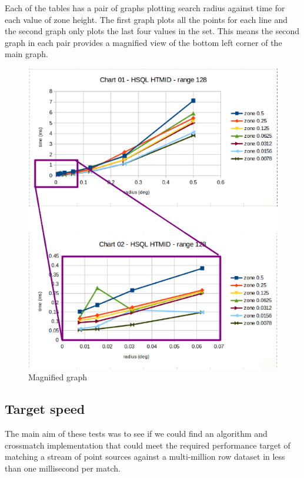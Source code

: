 \documentclass{article}
\newcommand{\crossmatch} {crossmatch\xspace}
\newcommand{\dataset} {dataset\xspace}
\begin{document}
Each of the tables has a pair of graphs plotting search radius against time for each value of zone height. The first graph plots all the points for each line and the second graph only plots the last four values in the set. This means the second graph in each pair provides a magnified view of the bottom left corner of the main graph.

\begin{figure}[hbt!]
\centering
\includegraphics[scale=0.75]{images/graph-zoom-01.png}
\caption{Magnified graph}
\label{fig:graph-zoom-01}
\end{figure}

\subsection{Target speed}
\label{target-speed}

The main aim of these tests was to see if we could find an algorithm and \crossmatch implementation that could meet the required performance target of matching a stream of point sources against a multi-million row \dataset in less than one millisecond per match.
\end{document}
